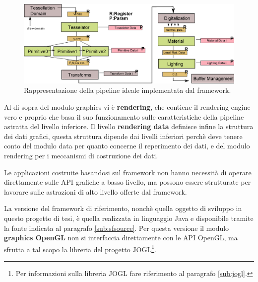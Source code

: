\begin{figure}
\begin{center}
\includegraphics[width=\textwidth]{Immagini/Pipeline}
\caption{Rappresentazione della pipeline ideale implementata dal framework.\label{f:sfpipeline}} 
\end{center} 
\end{figure}
Al di sopra del modulo graphics vi \`e \textbf{rendering}, che contiene il rendering engine vero e proprio che basa il suo funzionamento sulle caratteristiche della pipeline astratta del livello inferiore.
Il livello \textbf{rendering data} definisce infine la struttura dei dati grafici, questa struttura dipende dai livelli inferiori perch\`e deve tenere conto del modulo data per quanto concerne il reperimento dei dati, e del modulo rendering per i meccanismi di costruzione dei dati.

Le applicazioni costruite basandosi sul framework non hanno necessità di operare direttamente sulle \ac{API} grafiche a basso livello, ma possono essere strutturate per lavorare sulle astrazioni di alto livello offerte dal framework.

La versione del framework di riferimento, nonch\`e quella oggetto di sviluppo in questo progetto di tesi, \`e quella realizzata in linguaggio Java e disponibile tramite la fonte indicata al paragrafo \ref{sub:sfsource}. 
Per questa versione il modulo \textbf{graphics OpenGL} non si interfaccia direttamente con le \ac{API} OpenGL, ma sfrutta a tal scopo la libreria del progetto JOGL\footnote{Per informazioni sulla libreria JOGL fare riferimento al paragrafo \ref{sub:jogl}.}.
